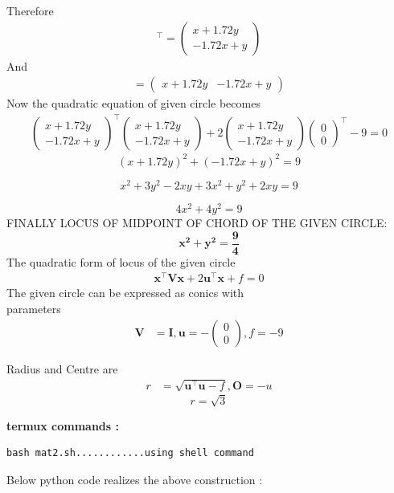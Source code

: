 \documentclass[10pt, a4paper]{article}
\newcommand{\myvec}[1]{\ensuremath{\begin{pmatrix}#1\end{pmatrix}}}
\let\vec\mathbf
\begin{document}
Therefore
\begin{align}
[\vec{2M(I+R)}^{-1}]^{\top}=\myvec{x+1.72y\\-1.72x+y}
\end{align}
And
\begin{align}
[\vec{2M(I+R)}^{-1}]=\myvec{x+1.72y & -1.72x+y}
\end{align}
Now the quadratic equation of given circle becomes
\begin{align}
\myvec{x+1.72y\\-1.72x+y}^{\top}\myvec{x+1.72y\\-1.72x+y}+2\myvec{x+1.72y\\-1.72x+y}\myvec{0 \\0}^{\top}-9=0
\end{align}
\begin{equation}
   (x+1.72y)^2+(-1.72x+y)^2=9
\end{equation}

\begin{equation}
   x^2+3y^2-2xy+3x^2+y^2+2xy=9
\end{equation}

\begin{equation}
   4x^2+4y^2=9
\end{equation}
 FINALLY LOCUS OF MIDPOINT OF  CHORD OF THE  GIVEN CIRCLE:\\
\begin{equation}
   \vec{x^2}+\vec{y^2}=\vec{\frac{9}{4}}
\end{equation}
The quadratic form of locus of the given circle
\begin{align}
\vec{x}^{\top}\vec{V}\vec{x}+2\vec{u}^{\top}\vec{x}+f=0
\end{align}
The given circle  can be expressed as conics with \\parameters
\begin{align}
	\vec{V} &= \vec{I}, \vec{u} = -\myvec{0 \\0}, f = -9
	\end{align}

	Radius and Centre are
	\begin{align}
	r &=\sqrt{{\vec{u}^{\top}\vec{u}}-f },\vec{O}=-u
    \end{align}
\begin{equation}
  r=\sqrt{3}
\end{equation}

\textbf{termux commands :}
\begin{lstlisting}
bash mat2.sh............using shell command
\end{lstlisting}
\begin{center}
Below python code realizes the above construction :
\end{center}
\end{document}

